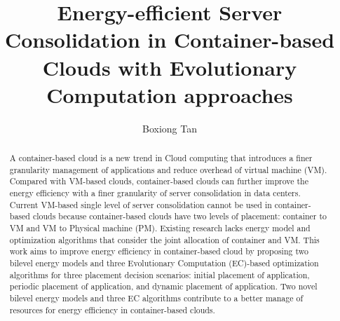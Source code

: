 \documentclass[11pt
              , a4paper
              , twoside
              , openright
              ]{report}
\title{Energy-efficient Server Consolidation in Container-based Clouds with Evolutionary Computation approaches}
\author{Boxiong Tan}
\date{}
\begin{document}



\begin{abstract}
\small
A container-based cloud is a new trend in Cloud computing that introduces a finer granularity management of applications and reduce overhead of virtual machine (VM).  Compared with VM-based clouds, container-based clouds can further improve the energy efficiency with a finer granularity of server consolidation in data centers. Current VM-based single level of server consolidation cannot be used in container-based clouds because container-based clouds have two levels of placement: container to VM and VM to Physical machine (PM). Existing research lacks energy model and optimization algorithms that consider the joint allocation of container and VM. 
This work aims to improve energy efficiency in container-based cloud by proposing two bilevel energy models and three Evolutionary Computation (EC)-based optimization algorithms for three placement decision scenarios: initial placement of application, periodic placement of application, and dynamic placement of application. Two novel bilevel energy models and three EC algorithms contribute to a better manage of resources for energy efficiency in container-based clouds. 


\end{abstract}


\maketitle

% 

\tableofcontents



\mainmatter









\backmatter



%


\end{document}
